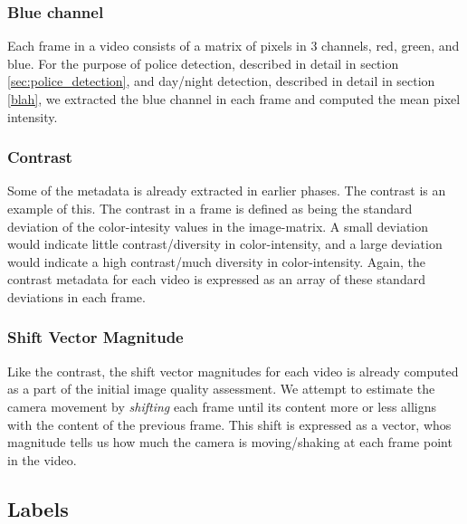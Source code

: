 \subsubsection{Blue channel}\label{sec:blue_channel}
%
Each frame in a video consists of a matrix of pixels in 3 channels, red, green, and blue. For the purpose of police detection, described in detail in section \ref{sec:police_detection}, and day/night detection, described in detail in section \ref{blah}, we extracted the blue channel in each frame and computed the mean pixel intensity. 
%
\subsubsection{Contrast}
%
Some of the metadata is already extracted in earlier phases. The contrast is an example of this. The contrast in a frame is defined as being the standard deviation of the color-intesity values in the image-matrix. A small deviation would indicate little contrast/diversity in color-intensity, and a large deviation would indicate a high contrast/much diversity in color-intensity. Again, the contrast metadata for each video is expressed as an array of these standard deviations in each frame.
%
\subsubsection{Shift Vector Magnitude}
%
Like the contrast, the shift vector magnitudes for each video is already computed as a part of the initial image quality assessment. We attempt to estimate the camera movement by \textit{shifting} each frame until its content more or less alligns with the content of the previous frame. This shift is expressed as a vector, whos magnitude tells us how much the camera is moving/shaking at each frame point in the video.
%
\subsection{Labels}
%

%
